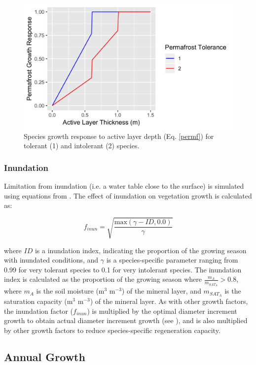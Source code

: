 \documentclass[a4paper, 12pt] {report}
\begin{document}
\begin{figure}
  \includegraphics[width=0.9\linewidth]{Figures/permf.png}
  \caption{Species growth response to active layer depth (Eq. \ref{permf}) for tolerant (1) and intolerant (2) species.}
  \label{fig:permff}
\end{figure}

\subsubsection{Inundation}

 Limitation from inundation (i.e. a water table close to the surface) is simulated using equations from . The effect of inundation on vegetation growth is calculated as:

\begin{equation} 
	f_{inun} = \sqrt{\frac{\text{max}(\gamma - ID, 0.0)}{\gamma}}
\end{equation}

where $ID$ is a inundation index, indicating the proportion of the growing season with inundated conditions, and $\gamma$ is a species-specific parameter ranging from 0.99 for very tolerant species to 0.1 for very intolerant species. The inundation index is calculated as the proportion of the growing season where $\frac{m_A}{m_{SAT_A}} > 0.8$, where $m_A$ is the soil moisture (m$^3$ m$^{-3}$) of the mineral layer, and $m_{SAT_A}$ is the saturation capacity (m$^3$ m$^{-3}$) of the mineral layer. As with other growth factors, the inundation factor ($f_{inun}$) is multiplied by the optimal diameter increment growth to obtain actual diameter increment growth (see ), and is also multiplied by other growth factors to reduce species-specific regeneration capacity.

\subsection{Annual Growth} \label{tgrowth}
\end{document}
